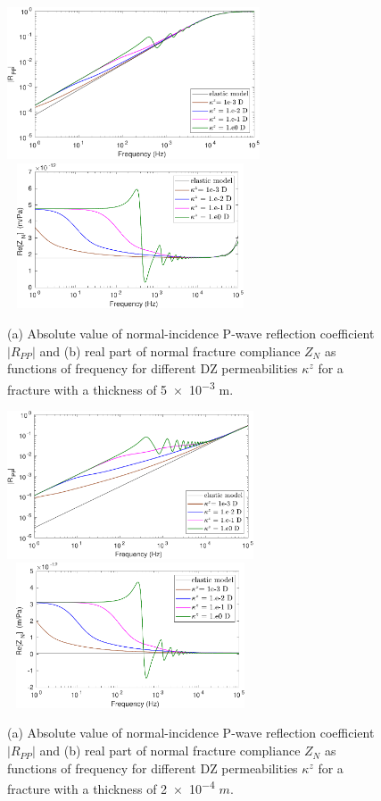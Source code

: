 \documentclass[draft]{agujournal2019}
\begin{document}
\begin{figure}
\centering
    \subcaptionbox{}
      {
       \includegraphics[width=75mm, height=45 mm]{figures/elasporo_5mm_ksen_h20e-2.pdf}
        }
    \subcaptionbox{}
      {
        \includegraphics[width=73mm, height=43mm]{figures/elasporo_5mm_znsen_h20e-2.pdf}
        }
\caption {(a) Absolute value of normal-incidence P-wave reflection coefficient $|R_{PP}|$ and (b) real part of normal fracture compliance $Z_N$ as functions of frequency for different DZ permeabilities $\kappa^z$ for a fracture with a thickness of \num{5e-3} m.}
\label{fig:7}
\end{figure}

\begin{figure}
\centering
    \subcaptionbox{}
      {
       \includegraphics[width=73mm, height=43 mm]{figures/elasporo_02mm_ksen_h20e-2.pdf}
        }
    \subcaptionbox{}
      {
        \includegraphics[width=73mm, height=43mm]{figures/elasporo_02mm_znsen_h20e-2.pdf}
        }
\caption {(a) Absolute value of normal-incidence P-wave reflection coefficient $|R_{PP}|$ and (b) real part of normal fracture compliance $Z_N$ as functions of frequency for different DZ permeabilities $\kappa^z$ for a fracture with a thickness of \num{2e-4} $m$.}
\label{fig:8}
\end{figure}
\end{document}
